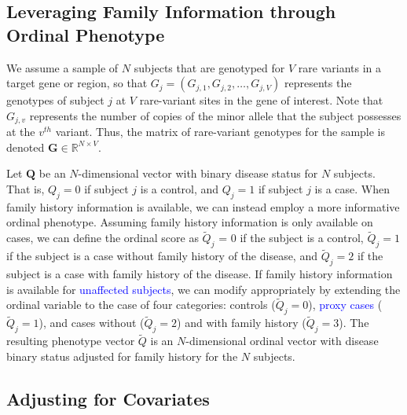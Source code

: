 \documentclass[]{article}
\begin{document}
\hypertarget{leveraging-family-information-through-ordinal-phenotype}{%
\subsection{Leveraging Family Information through Ordinal Phenotype}\label{leveraging-family-information-through-ordinal-phenotype}}

We assume a sample of \(N\) subjects that are genotyped for \(V\) rare variants
in a target gene or region, so that \(G_j = (G_{j,1}, G_{j,2},\dots, G_{j,V})\)
represents the genotypes of subject \(j\) at \(V\) rare-variant sites in the gene of interest.
Note that \(G_{j,v}\) represents the number of copies of the minor allele that
the subject possesses at the \(v^{th}\) variant. Thus, the matrix of rare-variant
genotypes for the sample is denoted \(\mathbf{G} \in \mathbb{R}^{N \times V}\).

Let \(\mathbf{Q}\) be an \(N\)-dimensional vector with binary disease status for \(N\) subjects. That is, \(Q_j=0\) if subject \(j\) is a control,
and \(Q_j=1\) if subject \(j\) is a case.
When family history
information is available,
we can instead employ a more informative
ordinal phenotype. Assuming family history information is only available on cases, we can define the ordinal score as \(\tilde{Q}_j\) = \(0\)
if the subject is a control, \(\tilde{Q}_j =1\) if the subject is a case
without family history of the disease, and \(\tilde{Q}_j =2\) if the subject
is a case with family history of the disease. If family history information is available for \textcolor{blue}{unaffected subjects}, we can modify appropriately by extending the ordinal variable to the case of four categories: controls (\(\tilde{Q}_j=0\)), \textcolor{blue}{proxy cases} (\(\tilde{Q}_j=1\)), and cases
without (\(\tilde{Q}_j=2\)) and with family history (\(\tilde{Q}_j=3\)). The resulting phenotype vector \(\tilde{Q}\) is an \(N\)-dimensional ordinal vector with disease binary
status adjusted for family history for the \(N\) subjects.

\hypertarget{adjusting-for-covariates}{%
\subsection{Adjusting for Covariates}\label{adjusting-for-covariates}}
\end{document}
